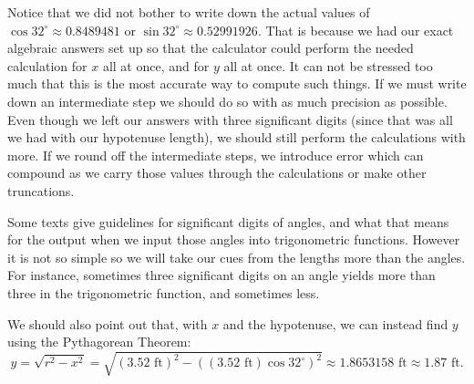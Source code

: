 Notice that we did not bother to write down the actual values of 
$\cos32^\circ\approx0.8489481$ or $\sin32^\circ\approx0.52991926$.
That is because we had our exact algebraic answers set up so that
the calculator could perform the needed calculation for $x$ all
at once, and for $y$ all at once.  It can not be stressed
too much that this is the most accurate way to compute such
things.  If we must write down an intermediate step we should
do so with as much precision as possible.  Even though we
left our answers with three significant digits (since that
was all we had with our hypotenuse length), we should
still perform the calculations with more.  If we round off the
intermediate steps, we introduce error which can compound as
we carry those values through the calculations or make
other truncations.

Some texts give guidelines for significant digits of angles,
and what that means for the output when we input those angles
into trigonometric functions.  However it is not so simple
so we will take our cues from the lengths more than the angles.
For instance, sometimes three significant digits on an angle 
yields more than three in the trigonometric function, and 
sometimes less.

We should also point out that, with $x$ and the hypotenuse,
we can instead find $y$ using the Pythagorean Theorem:\footnotemark
$$y=\sqrt{r^2-x^2}=
\sqrt{(3.52\text{ ft})^2-((3.52\text{ ft})\cos32^\circ)^2}
\approx1.8653158\text{ ft}\approx1.87\text{ ft}.$$

